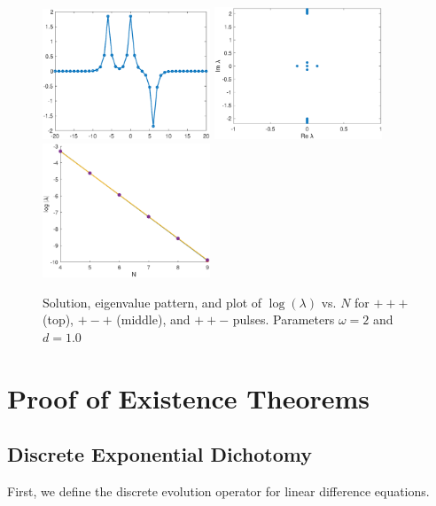 \documentclass[12pt]{article}
\begin{document}
\begin{figure}[H]
\includegraphics[width=5cm]{dnlsPPM.eps}
\includegraphics[width=5cm]{dnlsPPMeig.eps}
\includegraphics[width=5cm]{dnlsPPMdecay.eps}
\label{fig:eigendecay2}
\caption{Solution, eigenvalue pattern, and plot of $\log(\lambda)$ vs. $N$ for $+++$ (top), $+-+$ (middle), and $++-$ pulses. Parameters $\omega = 2$ and $d = 1.0$}
\end{figure}

\section{Proof of Existence Theorems}

\subsection{Discrete Exponential Dichotomy}

First, we define the discrete evolution operator for linear difference equations.
\end{document}

